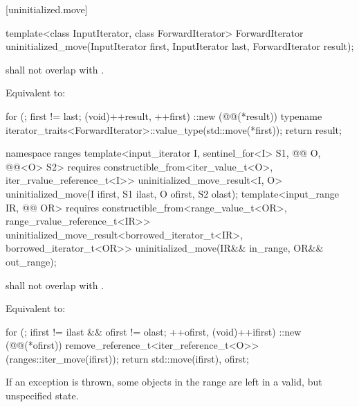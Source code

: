 [uninitialized.move]{}

%
\begin{itemdecl}
template<class InputIterator, class ForwardIterator>
  ForwardIterator uninitialized_move(InputIterator first, InputIterator last,
                                     ForwardIterator result);
\end{itemdecl}

\begin{itemdescr}
\pnum
\expects
{} shall not overlap with .

\pnum
\effects
Equivalent to:
\begin{codeblock}
for (; first != last; (void)++result, ++first)
  ::new (@@(*result))
    typename iterator_traits<ForwardIterator>::value_type(std::move(*first));
return result;
\end{codeblock}
\end{itemdescr}

%
\begin{itemdecl}
namespace ranges {
  template<input_iterator I, sentinel_for<I> S1,
           @@ O, @@<O> S2>
      requires constructible_from<iter_value_t<O>, iter_rvalue_reference_t<I>>
    uninitialized_move_result<I, O>
      uninitialized_move(I ifirst, S1 ilast, O ofirst, S2 olast);
  template<input_range IR, @@ OR>
      requires constructible_from<range_value_t<OR>, range_rvalue_reference_t<IR>>
    uninitialized_move_result<borrowed_iterator_t<IR>, borrowed_iterator_t<OR>>
      uninitialized_move(IR&& in_range, OR&& out_range);
}
\end{itemdecl}

\begin{itemdescr}
\pnum
\expects
{} shall not overlap with .

\pnum
\effects
Equivalent to:
\begin{codeblock}
for (; ifirst != ilast && ofirst != olast; ++ofirst, (void)++ifirst) {
  ::new (@@(*ofirst))
    remove_reference_t<iter_reference_t<O>>(ranges::iter_move(ifirst));
}
return {std::move(ifirst), ofirst};
\end{codeblock}

\pnum
\begin{note}
If an exception is thrown, some objects in the range  are
left in a valid, but unspecified state.
\end{note}
\end{itemdescr}

